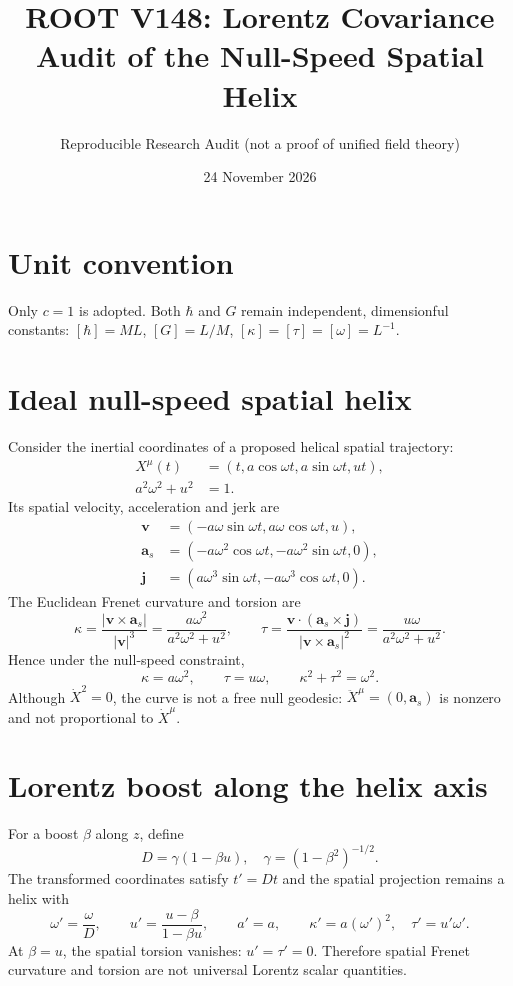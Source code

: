 \documentclass[11pt,a4paper]{article}
\title{ROOT V148: Lorentz Covariance Audit of the Null-Speed Spatial Helix}
\author{Reproducible Research Audit (not a proof of unified field theory)}
\date{24 November 2026}
\begin{document}
\maketitle
\section{Unit convention}
Only $c=1$ is adopted. Both $\hbar$ and $G$ remain independent, dimensionful constants:
$[\hbar]=ML$, $[G]=L/M$, $[\kappa]=[\tau]=[\omega]=L^{-1}$.
\section{Ideal null-speed spatial helix}
Consider the inertial coordinates of a proposed helical spatial trajectory:
\begin{align}
X^\mu(t)&=(t,a\cos\omega t,a\sin\omega t,ut),\\
a^2\omega^2+u^2&=1.
\end{align}
Its spatial velocity, acceleration and jerk are
\begin{align}
\mathbf v&=(-a\omega\sin\omega t,a\omega\cos\omega t,u),\\
\mathbf a_s&=(-a\omega^2\cos\omega t,-a\omega^2\sin\omega t,0),\\
\mathbf j&=(a\omega^3\sin\omega t,-a\omega^3\cos\omega t,0).
\end{align}
The Euclidean Frenet curvature and torsion are
\begin{equation}
\kappa=\frac{|\mathbf v\times\mathbf a_s|}{|\mathbf v|^3}
=\frac{a\omega^2}{a^2\omega^2+u^2},\qquad
\tau=\frac{\mathbf v\cdot(\mathbf a_s\times\mathbf j)}{|\mathbf v\times\mathbf a_s|^2}
=\frac{u\omega}{a^2\omega^2+u^2}.
\end{equation}
Hence under the null-speed constraint,
\begin{equation}
\boxed{\kappa=a\omega^2,\qquad \tau=u\omega,\qquad\kappa^2+\tau^2=\omega^2.}
\end{equation}
Although $\dot X^2=0$, the curve is not a free null geodesic:
$\ddot X^\mu=(0,\mathbf a_s)$ is nonzero and not proportional to $\dot X^\mu$.
\section{Lorentz boost along the helix axis}
For a boost $\beta$ along $z$, define
\begin{equation}
D=\gamma(1-\beta u),\quad \gamma=(1-\beta^2)^{-1/2}.
\end{equation}
The transformed coordinates satisfy $t'=Dt$ and the spatial projection remains a helix with
\begin{equation}
\boxed{
\omega'=\frac\omega D,\qquad
u'=\frac{u-\beta}{1-\beta u},\qquad
a'=a,\qquad \kappa'=a(\omega')^2,\quad\tau'=u'\omega'.
}
\end{equation}
At $\beta=u$, the spatial torsion vanishes: $u'=\tau'=0$.
Therefore spatial Frenet curvature and torsion are not universal Lorentz scalar quantities.
\end{document}

